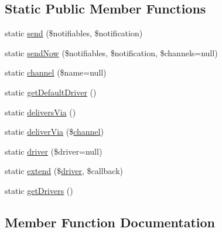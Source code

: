 \subsection*{Static Public Member Functions}
\begin{DoxyCompactItemize}
\item 
static \mbox{\hyperlink{class_illuminate_1_1_support_1_1_facades_1_1_notification_a31adb0465773570a5615db01b7614e1d}{send}} (\$notifiables, \$notification)
\item 
static \mbox{\hyperlink{class_illuminate_1_1_support_1_1_facades_1_1_notification_a819fe4008c9dae1b5e73ed545c38da28}{send\+Now}} (\$notifiables, \$notification, \$channels=null)
\item 
static \mbox{\hyperlink{class_illuminate_1_1_support_1_1_facades_1_1_notification_a4b78c2b99146e23280f66bb0583b3b86}{channel}} (\$name=null)
\item 
static \mbox{\hyperlink{class_illuminate_1_1_support_1_1_facades_1_1_notification_ab82a413b9b4724ddea3c230968b7f986}{get\+Default\+Driver}} ()
\item 
static \mbox{\hyperlink{class_illuminate_1_1_support_1_1_facades_1_1_notification_ad85a8e98cfaac2699104bee89e9432ed}{delivers\+Via}} ()
\item 
static \mbox{\hyperlink{class_illuminate_1_1_support_1_1_facades_1_1_notification_ad63d78e3070748dcea4d9b54fd775312}{deliver\+Via}} (\$\mbox{\hyperlink{class_illuminate_1_1_support_1_1_facades_1_1_notification_a4b78c2b99146e23280f66bb0583b3b86}{channel}})
\item 
static \mbox{\hyperlink{class_illuminate_1_1_support_1_1_facades_1_1_notification_a47a033fe464871a4d6a6279a157effcf}{driver}} (\$driver=null)
\item 
static \mbox{\hyperlink{class_illuminate_1_1_support_1_1_facades_1_1_notification_a584448fd4e1ce7434b76b0a8dd274352}{extend}} (\$\mbox{\hyperlink{class_illuminate_1_1_support_1_1_facades_1_1_notification_a47a033fe464871a4d6a6279a157effcf}{driver}}, \$callback)
\item 
static \mbox{\hyperlink{class_illuminate_1_1_support_1_1_facades_1_1_notification_ab3df521a78ceb9f83d41e0e8af054936}{get\+Drivers}} ()
\end{DoxyCompactItemize}


\subsection{Member Function Documentation}
\mbox{\label{class_illuminate_1_1_support_1_1_facades_1_1_notification_a4b78c2b99146e23280f66bb0583b3b86}} 
